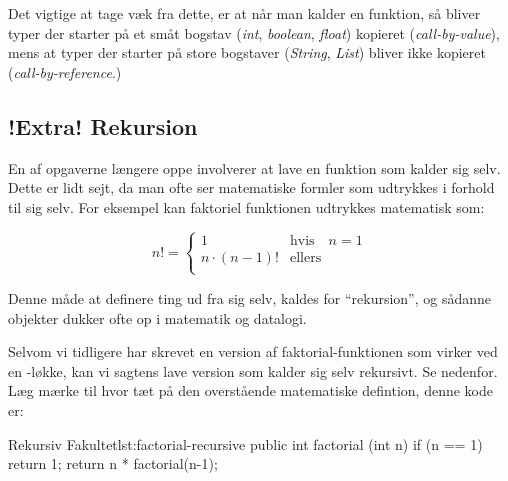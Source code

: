         Det vigtige at tage væk fra dette, er at når man kalder en
        funktion, så bliver typer der starter på et småt bogstav
        (\emph{int}, \emph{boolean}, \emph{float}) kopieret
        (\emph{call-by-value}), mens at typer der starter på store
        bogstaver (\emph{String}, \emph{List}) bliver ikke kopieret
        (\emph{call-by-reference}.)


	\subsection{!Extra! Rekursion}


        En af opgaverne længere  oppe
        involverer at lave en funktion som kalder sig selv. Dette er
        lidt sejt, da man ofte ser matematiske formler som udtrykkes i
        forhold til sig selv. For eksempel kan faktoriel funktionen
        udtrykkes matematisk som:

        \begin{equation}
            n! = \begin{cases}
                       1 & \text{hvis} \quad n = 1 \\
                       n\cdot(n-1)! & \text{ellers} \\
                  \end{cases}
        \end{equation}

        Denne måde at definere ting ud fra sig selv, kaldes for
        ``rekursion'', og sådanne objekter dukker ofte op i matematik
        og datalogi.


        Selvom vi tidligere har skrevet en version af
        faktorial-funktionen som virker ved en -løkke,
        kan vi sagtens lave version som kalder sig selv rekursivt. Se
        nedenfor. Læg mærke til hvor tæt på den overstående
        matematiske defintion, denne kode er:

        \begin{JavaCode}{Rekursiv Fakultet}{lst:factorial-recursive}
            public int factorial (int n) {
                if (n == 1)   return 1;
                return n * factorial(n-1);
            }
        \end{JavaCode}

